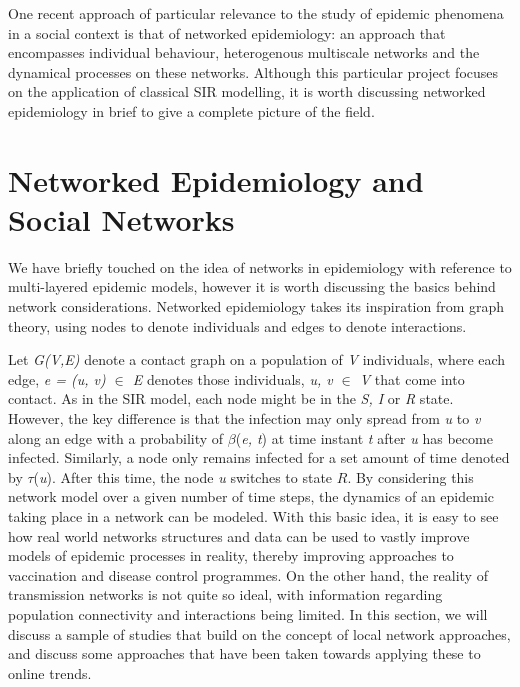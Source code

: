 One recent approach of particular relevance to the study of epidemic
phenomena in a social context is that of networked epidemiology: an
approach that encompasses individual behaviour, heterogenous
multiscale networks and the dynamical processes on these
networks. Although this particular project focuses on the application
of classical SIR modelling, it is worth discussing networked
epidemiology in brief to give a complete picture of the field.

\section{Networked Epidemiology and Social Networks} 

We have briefly touched on the idea of networks in epidemiology with
reference to multi-layered epidemic models, however it is worth
discussing the basics behind network considerations.\cite{tizzoni,
  gefm} Networked epidemiology takes its inspiration from graph
theory, using nodes to denote individuals and edges to denote
interactions. 

Let \emph{G(V,E)} denote a contact graph on a population of \emph{V}
individuals, where each edge, \emph{e = (u, v) $\in$ E} denotes those
individuals, \emph{u, v $\in$ V} that come into contact. As in the SIR
model, each node might be in the \emph{ S, I} or \emph{R}
state. However, the key difference is that the infection may only
spread from \emph{u} to \emph{v} along an edge with a probability of
$\beta$(\emph{e, t}) at time instant \emph{t} after \emph{u} has
become infected. Similarly, a node only remains infected for a set
amount of time denoted by $\tau$(\emph{u}). After this time, the node
\emph{u} switches to state $R$. By considering this network model over
a given number of time steps, the dynamics of an epidemic taking place
in a network can be modeled. With this basic idea, it is easy to see
how real world networks structures and data can be used to vastly
improve models of epidemic processes in reality, thereby improving
approaches to vaccination and disease control programmes.\cite{danon}
On the other hand, the reality of transmission networks is not quite
so ideal, with information regarding population connectivity and
interactions being limited. In this section, we will discuss a sample
of studies that build on the concept of local network approaches, and
discuss some approaches that have been taken towards applying these to
online trends.

